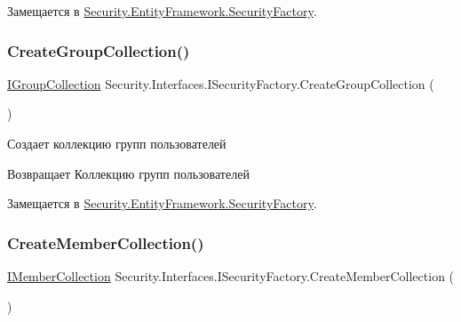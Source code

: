 Замещается в \hyperlink{class_security_1_1_entity_framework_1_1_security_factory_a63112a33e799949f653a7b3420bb5a83}{Security.\+Entity\+Framework.\+Security\+Factory}.

\mbox{\label{interface_security_1_1_interfaces_1_1_i_security_factory_a40b900dd3f5097db8ac77610cbc54e58}} 
\subsubsection{\texorpdfstring{Create\+Group\+Collection()}{CreateGroupCollection()}}
{\footnotesize\ttfamily \hyperlink{interface_security_1_1_interfaces_1_1_collections_1_1_i_group_collection}{I\+Group\+Collection} Security.\+Interfaces.\+I\+Security\+Factory.\+Create\+Group\+Collection (\begin{DoxyParamCaption}{ }\end{DoxyParamCaption})}



Создает коллекцию групп пользователей 

\begin{DoxyReturn}{Возвращает}
Коллекцию групп пользователей
\end{DoxyReturn}


Замещается в \hyperlink{class_security_1_1_entity_framework_1_1_security_factory_ad08ab6dc0f55eba7bc8adfc3a982ae1b}{Security.\+Entity\+Framework.\+Security\+Factory}.

\mbox{\label{interface_security_1_1_interfaces_1_1_i_security_factory_af51be7d74fbdd43fe5970ab28359ef2a}} 
\subsubsection{\texorpdfstring{Create\+Member\+Collection()}{CreateMemberCollection()}}
{\footnotesize\ttfamily \hyperlink{interface_security_1_1_interfaces_1_1_collections_1_1_i_member_collection}{I\+Member\+Collection} Security.\+Interfaces.\+I\+Security\+Factory.\+Create\+Member\+Collection (\begin{DoxyParamCaption}{ }\end{DoxyParamCaption})}



